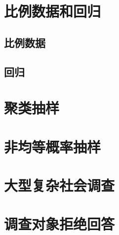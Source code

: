 \documentclass[]{ctexbook}
\begin{document}
\hypertarget{section-3}{%
\chapter{比例数据和回归}\label{section-3}}

\hypertarget{section-4}{%
\section{比例数据}\label{section-4}}

\hypertarget{section-5}{%
\section{回归}\label{section-5}}

\hypertarget{section-6}{%
\chapter{聚类抽样}\label{section-6}}

\hypertarget{section-7}{%
\chapter{非均等概率抽样}\label{section-7}}

\hypertarget{section-8}{%
\chapter{大型复杂社会调查}\label{section-8}}

\hypertarget{section-9}{%
\chapter{调查对象拒绝回答}\label{section-9}}




\backmatter
\printindex
\end{document}
